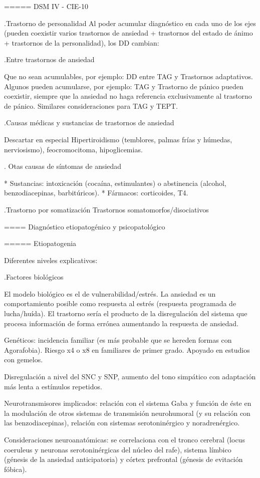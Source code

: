 \documentclass{scrbook}
\begin{document}
===== DSM IV - CIE-10

.Trastorno de personalidad
Al poder acumular diagnóstico en cada uno de los ejes (pueden coexistir varios trastornos de ansiedad + trastornos del estado de ánimo + trastornos de la personalidad), los DD cambian:

.Entre trastornos de ansiedad

Que no sean acumulables, por ejemplo: DD entre TAG y Trastornos adaptativos. Algunos pueden acumularse, por ejemplo: TAG y Trastorno de pánico pueden coexistir, siempre que la ansiedad no haga referencia exclusivamente al trastorno de pánico. Similares consideraciones para TAG y TEPT.

.Causas médicas y sustancias de trastornos de ansiedad

Descartar en especial Hipertiroidismo (temblores, palmas frías y húmedas, nerviosismo), feocromocitoma, hipoglicemias.

. Otas causas de síntomas de ansiedad

* Sustancias: intoxicación (cocaína, estimulantes) o abstinencia (alcohol, benzodiacepinas, barbitúricos).
* Fármacos: corticoides, T4.

.Trastorno por somatización
Trastornos somatomorfos/disociativos

==== Diagnóstico etiopatogénico y psicopatológico

===== Etiopatogenia

Diferentes niveles explicativos:

.Factores biológicos

El modelo biológico es el de vulnerabilidad/estrés. La ansiedad es un comportamiento posible como respuesta al estrés (respuesta programada de lucha/huída). El trastorno sería el producto de la disregulación del sistema que procesa información de forma errónea aumentando la respuesta de ansiedad.

Genéticos: incidencia familiar (es más probable que se hereden formas con Agorafobia). Riesgo x4 o x8 en familiares de primer grado. Apoyado en estudios con gemelos.

Disregulación a nivel del SNC y SNP, aumento del tono simpático con adaptación más lenta a estímulos repetidos.

Neurotransmisores implicados: relación con el sistema Gaba y función de éste en la modulación de otros sistemas de transmisión neurohumoral (y su relación con las benzodiacepinas), relación con sistemas serotoninérgico y noradrenérgico.

Consideraciones neuroanatómicas: se correlaciona con el tronco cerebral (locus coeruleus y neuronas serotoninérgicas del núcleo del rafe), sistema límbico (génesis de la ansiedad anticipatoria) y córtex prefrontal (génesis de evitación fóbica).
\end{document}
